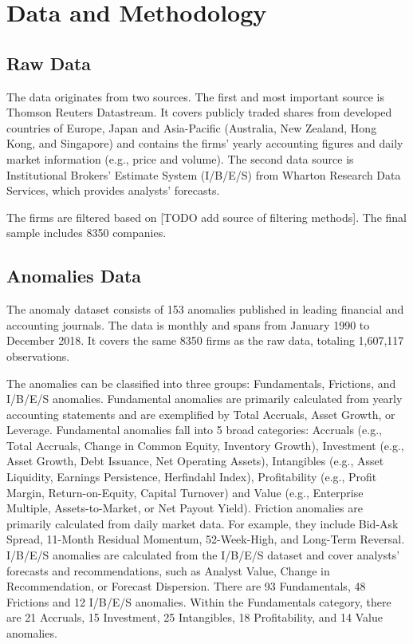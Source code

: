 \chapter{Data and Methodology}
\label{chap:met}

\section{Raw Data}

	The data originates from two sources. The first and most important source is Thomson Reuters Datastream. It covers publicly traded shares from developed countries of Europe, Japan and Asia-Pacific (Australia, New Zealand, Hong Kong, and Singapore) and contains the firms' yearly accounting figures and daily market information (e.g., price and volume).  The second data source is Institutional Brokers’ Estimate System (I/B/E/S) from Wharton Research Data Services, which provides analysts' forecasts. 
	
	The firms are filtered based on [TODO add source of filtering methods].  
	The final sample includes 8350 companies.


\section{Anomalies Data}
	The anomaly dataset consists of 153 anomalies published in leading financial and accounting journals. The data is monthly and spans from January 1990 to December 2018. It covers the same 8350 firms as the raw data, totaling 1,607,117 observations. 
	
	The anomalies can be classified into three groups: Fundamentals, Frictions, and I/B/E/S anomalies. Fundamental anomalies are primarily calculated from yearly accounting statements and are exemplified by Total Accruals, Asset Growth, or Leverage. Fundamental anomalies fall into 5 broad categories: Accruals (e.g., Total Accruals, Change in Common Equity, Inventory Growth), Investment (e.g., Asset Growth, Debt Issuance, Net Operating Assets), Intangibles (e.g., Asset Liquidity, Earnings Persistence, Herfindahl Index), Profitability (e.g., Profit Margin, Return-on-Equity, Capital Turnover) and Value (e.g., Enterprise Multiple, Assets-to-Market, or Net Payout Yield). Friction anomalies are primarily calculated from daily market data. For example, they include Bid-Ask Spread, 11-Month Residual Momentum, 52-Week-High, and Long-Term Reversal. I/B/E/S anomalies are calculated from the I/B/E/S dataset and cover analysts' forecasts and recommendations, such as Analyst Value, Change in Recommendation, or Forecast Dispersion. There are 93 Fundamentals, 48 Frictions and 12 I/B/E/S anomalies. Within the Fundamentals category, there are 21 Accruals, 15 Investment, 25 Intangibles, 18 Profitability, and 14 Value anomalies.  
	
